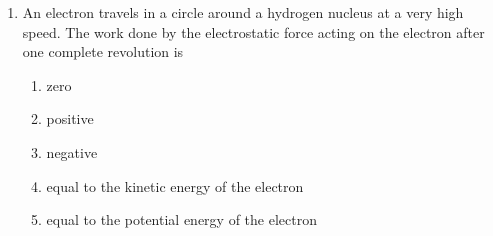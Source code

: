 \documentclass{../../oss-apphys}
\begin{document}
\begin{multicols}{2}
\begin{enumerate}[resume,leftmargin=18pt]
  \item An electron travels in a circle around a hydrogen nucleus at a very high
    speed. The work done by the electrostatic force acting on the electron
    after one complete revolution is
    \begin{enumerate}[noitemsep,topsep=0pt,leftmargin=18pt,label=(\Alph*)]
    \item zero
    \item positive
    \item negative
    \item equal to the kinetic energy of the electron
    \item equal to the potential energy of the electron
    \end{enumerate}
    
  \end{enumerate}
\end{multicols}
\end{document}
